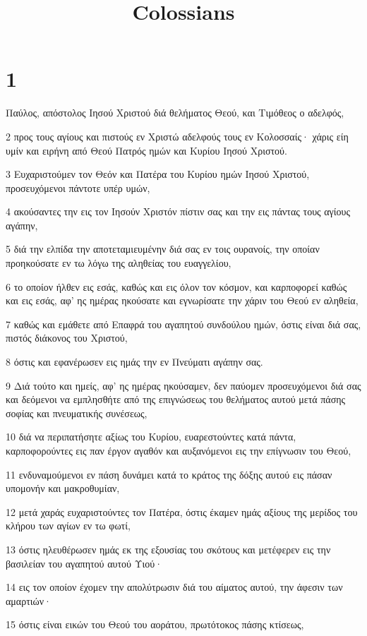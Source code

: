 

\title{Colossians}


\chapter{1}

\par Παύλος, απόστολος Ιησού Χριστού διά θελήματος Θεού, και Τιμόθεος ο αδελφός,
\par 2 προς τους αγίους και πιστούς εν Χριστώ αδελφούς τους εν Κολοσσαίς· χάρις είη υμίν και ειρήνη από Θεού Πατρός ημών και Κυρίου Ιησού Χριστού.
\par 3 Ευχαριστούμεν τον Θεόν και Πατέρα του Κυρίου ημών Ιησού Χριστού, προσευχόμενοι πάντοτε υπέρ υμών,
\par 4 ακούσαντες την εις τον Ιησούν Χριστόν πίστιν σας και την εις πάντας τους αγίους αγάπην,
\par 5 διά την ελπίδα την αποτεταμιευμένην διά σας εν τοις ουρανοίς, την οποίαν προηκούσατε εν τω λόγω της αληθείας του ευαγγελίου,
\par 6 το οποίον ήλθεν εις εσάς, καθώς και εις όλον τον κόσμον, και καρποφορεί καθώς και εις εσάς, αφ' ης ημέρας ηκούσατε και εγνωρίσατε την χάριν του Θεού εν αληθεία,
\par 7 καθώς και εμάθετε από Επαφρά του αγαπητού συνδούλου ημών, όστις είναι διά σας, πιστός διάκονος του Χριστού,
\par 8 όστις και εφανέρωσεν εις ημάς την εν Πνεύματι αγάπην σας.
\par 9 Διά τούτο και ημείς, αφ' ης ημέρας ηκούσαμεν, δεν παύομεν προσευχόμενοι διά σας και δεόμενοι να εμπλησθήτε από της επιγνώσεως του θελήματος αυτού μετά πάσης σοφίας και πνευματικής συνέσεως,
\par 10 διά να περιπατήσητε αξίως του Κυρίου, ευαρεστούντες κατά πάντα, καρποφορούντες εις παν έργον αγαθόν και αυξανόμενοι εις την επίγνωσιν του Θεού,
\par 11 ενδυναμούμενοι εν πάση δυνάμει κατά το κράτος της δόξης αυτού εις πάσαν υπομονήν και μακροθυμίαν,
\par 12 μετά χαράς ευχαριστούντες τον Πατέρα, όστις έκαμεν ημάς αξίους της μερίδος του κλήρου των αγίων εν τω φωτί,
\par 13 όστις ηλευθέρωσεν ημάς εκ της εξουσίας του σκότους και μετέφερεν εις την βασιλείαν του αγαπητού αυτού Υιού·
\par 14 εις τον οποίον έχομεν την απολύτρωσιν διά του αίματος αυτού, την άφεσιν των αμαρτιών·
\par 15 όστις είναι εικών του Θεού του αοράτου, πρωτότοκος πάσης κτίσεως,
